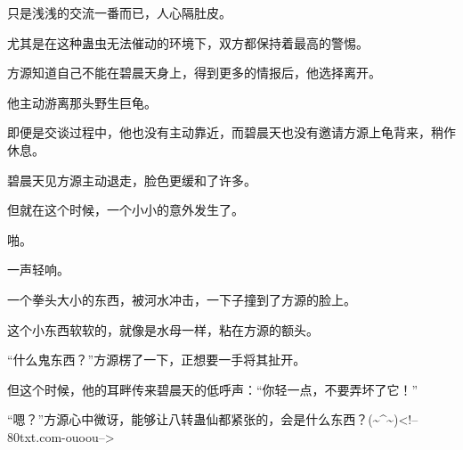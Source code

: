 \begin{this_body}
只是浅浅的交流一番而已，人心隔肚皮。

尤其是在这种蛊虫无法催动的环境下，双方都保持着最高的警惕。

方源知道自己不能在碧晨天身上，得到更多的情报后，他选择离开。

他主动游离那头野生巨龟。

即便是交谈过程中，他也没有主动靠近，而碧晨天也没有邀请方源上龟背来，稍作休息。

碧晨天见方源主动退走，脸色更缓和了许多。

但就在这个时候，一个小小的意外发生了。

啪。

一声轻响。

一个拳头大小的东西，被河水冲击，一下子撞到了方源的脸上。

这个小东西软软的，就像是水母一样，粘在方源的额头。

“什么鬼东西？”方源楞了一下，正想要一手将其扯开。

但这个时候，他的耳畔传来碧晨天的低呼声：“你轻一点，不要弄坏了它！”

“嗯？”方源心中微讶，能够让八转蛊仙都紧张的，会是什么东西？(\~{}\^{}\~{})<!--80txt.com-ouoou-->

\end{this_body}

